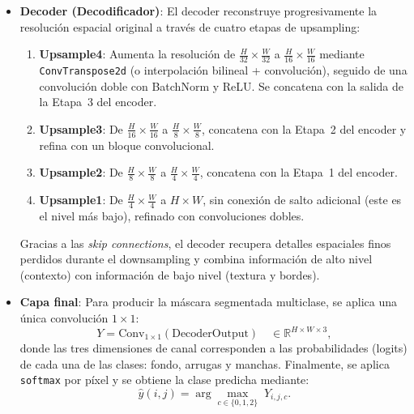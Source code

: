 \begin{itemize}
  \item \textbf{Decoder (Decodificador)}:  
    El decoder reconstruye progresivamente la resolución espacial original a través de cuatro etapas de upsampling:
    \begin{enumerate}
      \item \textbf{Upsample4}: Aumenta la resolución de $\frac{H}{32}\times\frac{W}{32}$ a $\frac{H}{16}\times\frac{W}{16}$ mediante \texttt{ConvTranspose2d} (o interpolación bilineal + convolución), seguido de una convolución doble con BatchNorm y ReLU. Se concatena con la salida de la Etapa 3 del encoder.
      \item \textbf{Upsample3}: De $\frac{H}{16}\times\frac{W}{16}$ a $\frac{H}{8}\times\frac{W}{8}$, concatena con la Etapa 2 del encoder y refina con un bloque convolucional.
      \item \textbf{Upsample2}: De $\frac{H}{8}\times\frac{W}{8}$ a $\frac{H}{4}\times\frac{W}{4}$, concatena con la Etapa 1 del encoder.
      \item \textbf{Upsample1}: De $\frac{H}{4}\times\frac{W}{4}$ a $H\times W$, sin conexión de salto adicional (este es el nivel más bajo), refinado con convoluciones dobles.
    \end{enumerate}
    Gracias a las \textit{skip connections}, el decoder recupera detalles espaciales finos perdidos durante el downsampling y combina información de alto nivel (contexto) con información de bajo nivel (textura y bordes).

  \item \textbf{Capa final}:  
    Para producir la máscara segmentada multiclase, se aplica una única convolución $1\times1$:
    \[
      Y = \mathrm{Conv}_{1\times1}(\text{DecoderOutput}) \quad\in\mathbb{R}^{H\times W\times 3},
    \]
    donde las tres dimensiones de canal corresponden a las probabilidades (logits) de cada una de las clases: fondo, arrugas y manchas. Finalmente, se aplica \texttt{softmax} por píxel y se obtiene la clase predicha mediante:
    \[
      \hat{y}(i,j) = \arg\max_{c\in\{0,1,2\}} \;Y_{i,j,c}.
    \]
\end{itemize}

